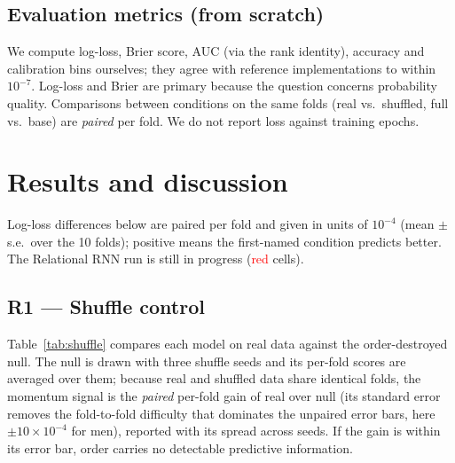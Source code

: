 \documentclass[10pt,a4paper]{article}
\newcommand{\ph}[1]{\textcolor{red}{#1}}
\begin{document}
\subsection{Evaluation metrics (from scratch)}
We compute log-loss, Brier score, AUC (via the rank identity), accuracy and
calibration bins ourselves; they agree with reference implementations to within
$10^{-7}$. Log-loss and Brier are primary because the question concerns
probability quality. Comparisons between conditions on the same folds (real
vs.\ shuffled, full vs.\ base) are \emph{paired} per fold. We do not report loss
against training epochs.

\section{Results and discussion}
Log-loss differences below are paired per fold and given in units of
$10^{-4}$ (mean $\pm$ s.e.\ over the 10 folds); positive means the first-named
condition predicts better. The Relational RNN run is still in progress
(\ph{red} cells).

\subsection{R1 --- Shuffle control}
Table~\ref{tab:shuffle} compares each model on real data against the order-destroyed
null. The null is drawn with three shuffle seeds and its per-fold scores are
averaged over them; because real and shuffled data share identical folds, the
momentum signal is the \emph{paired} per-fold gain of real over null (its
standard error removes the fold-to-fold difficulty that dominates the unpaired
error bars, here $\pm10\times10^{-4}$ for men), reported with its spread across
seeds. If the gain is within its error bar, order carries no detectable
predictive information.
\end{document}
